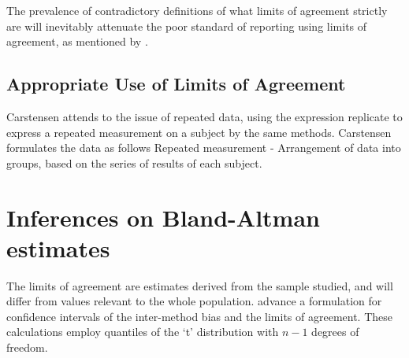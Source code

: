 \documentclass[12pt, a4paper]{report}
\theoremstyle{plain}
\theoremstyle{definition}
\theoremstyle{remark}
\begin{document}
The prevalence of contradictory definitions of what limits of agreement strictly are will inevitably attenuate the poor standard of reporting using limits of agreement, as mentioned by \citet{mantha}.
	
	
	
	


	\subsection{Appropriate Use of Limits of Agreement}
		
	Carstensen attends to the issue of repeated data, using the
	expression replicate to express a repeated measurement on a
	subject by the same methods. Carstensen formulates the data as
	follows Repeated measurement - Arrangement of data into groups,
	based on the series of results of each subject.
	
	
	
	
	\section{Inferences on Bland-Altman estimates}
	The limits of agreement are estimates derived from the sample
	studied, and will differ from values relevant to the whole
	population. \citet*{BA86} advance a formulation for confidence
	intervals of the inter-method bias and the limits of agreement.
	These calculations employ quantiles of the `t' distribution with
	$n -1$ degrees of freedom.
	
\end{document}
